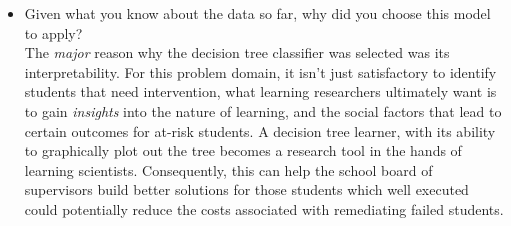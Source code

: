 \documentclass[12pt]{article}
\begin{document}
\begin{itemize}
\item Given what you know about the data so far, why did you choose this model to apply?\\
The \textit{major} reason why the decision tree classifier was selected was its interpretability. For this problem domain, it isn't just satisfactory to identify students that need intervention, what learning researchers ultimately want is to gain \textit{insights} into the nature of learning, and the social factors that lead to certain outcomes for at-risk students. A decision tree learner, with its ability to graphically plot out the tree becomes a research tool in the hands of learning scientists. Consequently, this can help the school board of supervisors build better solutions for those students which well executed could potentially reduce the costs associated with remediating failed students.\\

\end{itemize} 




\end{document}
